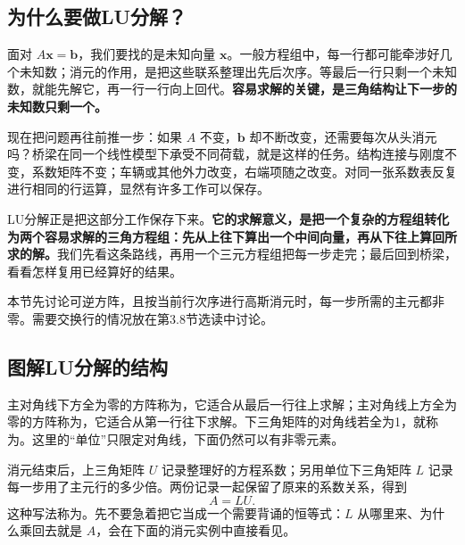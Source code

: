 \documentclass[a4paper,12pt,twoside,openany,fontset=none]{ctexbook}
\numberwithin{equation}{chapter}
\begin{document}
\subsection{为什么要做LU分解？}

面对 $A\boldsymbol x=\boldsymbol b$，我们要找的是未知向量 $\boldsymbol x$。一般方程组中，每一行都可能牵涉好几个未知数；消元的作用，是把这些联系整理出先后次序。等最后一行只剩一个未知数，就能先解它，再一行一行向上回代。\textbf{容易求解的关键，是三角结构让下一步的未知数只剩一个。}

现在把问题再往前推一步：如果 $A$ 不变，$\boldsymbol b$ 却不断改变，还需要每次从头消元吗？桥梁在同一个线性模型下承受不同荷载，就是这样的任务。结构连接与刚度不变，系数矩阵不变；车辆或其他外力改变，右端项随之改变。对同一张系数表反复进行相同的行运算，显然有许多工作可以保存。

LU分解正是把这部分工作保存下来。\textbf{它的求解意义，是把一个复杂的方程组转化为两个容易求解的三角方程组：先从上往下算出一个中间向量，再从下往上算回所求的解。}我们先看这条路线，再用一个三元方程组把每一步走完；最后回到桥梁，看看怎样复用已经算好的结果。

本节先讨论可逆方阵，且按当前行次序进行高斯消元时，每一步所需的主元都非零。需要交换行的情况放在第3.8节选读中讨论。

\subsection{图解LU分解的结构}

主对角线下方全为零的方阵称为，它适合从最后一行往上求解；主对角线上方全为零的方阵称为，它适合从第一行往下求解。下三角矩阵的对角线若全为1，就称为。这里的“单位”只限定对角线，下面仍然可以有非零元素。

消元结束后，上三角矩阵 $U$ 记录整理好的方程系数；另用单位下三角矩阵 $L$ 记录每一步用了主元行的多少倍。两份记录一起保留了原来的系数关系，得到
\[
 \boxed{A=LU.}
\]
这种写法称为。先不要急着把它当成一个需要背诵的恒等式：$L$ 从哪里来、为什么乘回去就是 $A$，会在下面的消元实例中直接看见。
\end{document}
